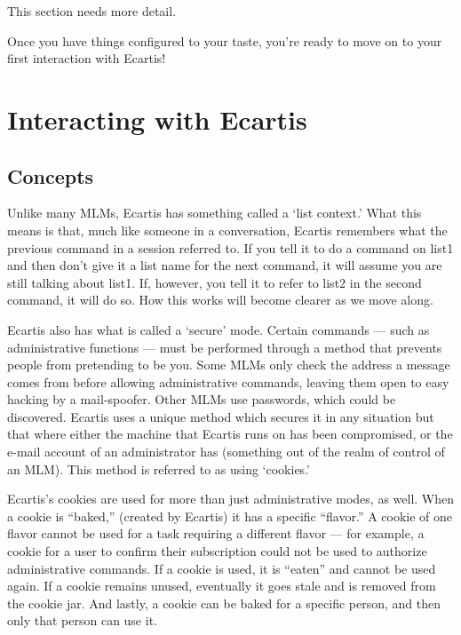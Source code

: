 \documentclass{book}
\begin{document}
   
This section needs more detail.
   
Once you have things configured to your taste, you're ready to move on to your
first interaction with Ecartis!
   
\chapter{Interacting with Ecartis}
\label{interface}
   
\section{Concepts}
\label{interface:concepts}
   
Unlike many MLMs, Ecartis has something called a `list context.'  What this
means is that, much like someone in a conversation, Ecartis remembers what the
previous command in a session referred to.  If you tell it to do a command on
list1 and then don't give it a list name for the next command, it will assume
you are still talking about list1.  If, however, you tell it to refer to list2
in the second command, it will do so.  How this works will become clearer as
we move along.
   
Ecartis also has what is called a `secure' mode.  Certain commands --- such as
administrative functions --- must be performed through a method that prevents
people from pretending to be you.  Some MLMs only check the address a message
comes from before allowing administrative commands, leaving them open to easy
hacking by a mail-spoofer.  Other MLMs use passwords, which could be
discovered.  Ecartis uses a unique method which secures it in any situation
but that where either the machine that Ecartis runs on has been compromised,
or the e-mail account of an administrator has (something out of the realm of
control of an MLM).  This method is referred to as using `cookies.'
   
Ecartis's cookies are used for more than just administrative modes, as well.
When a cookie is ``baked,'' (created by Ecartis) it has a specific ``flavor.''
A cookie of one flavor cannot be used for a task requiring a different flavor
--- for example, a cookie for a user to confirm their subscription could not
be used to authorize administrative commands.  If a cookie is used, it is
``eaten'' and cannot be used again.  If a cookie remains unused, eventually it
goes stale and is removed from the cookie jar.  And lastly, a cookie can be
baked for a specific person, and then only that person can use it.
   
\end{document}

